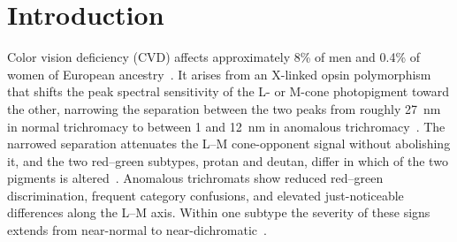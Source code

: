 
\section{Introduction}
\label{sec:intro}

Color vision deficiency (CVD) affects approximately 8\% of men and 0.4\% of women of European ancestry~\citep{birch2012}. It arises from an X-linked opsin polymorphism that shifts the peak spectral sensitivity of the L- or M-cone photopigment toward the other, narrowing the separation between the two peaks from roughly 27~nm in normal trichromacy to between 1 and 12~nm in anomalous trichromacy~\citep{deeb2005, neitz2011, bosten2019}. The narrowed separation attenuates the L--M cone-opponent signal without abolishing it, and the two red--green subtypes, protan and deutan, differ in which of the two pigments is altered~\citep{neitz2011}. Anomalous trichromats show reduced red--green discrimination, frequent category confusions, and elevated just-noticeable differences along the L--M axis. Within one subtype the severity of these signs extends from near-normal to near-dichromatic~\citep{bosten2019, neitz2011}.

